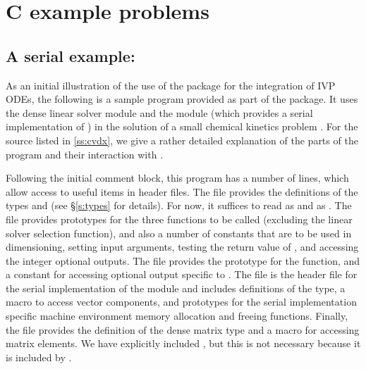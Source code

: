 \section{C example problems}\label{s:ex_c}

\subsection{A serial example: }\label{ss:kinwebs}

As an initial illustration of the use of the {\cvodes} package for the
integration of IVP ODEs, the following is a sample program provided as part 
of the package.  It uses the {\cvodes} dense linear solver module {\cvdense} 
and the {\nvecs} module (which provides a serial implementation of {\nvector})
in the solution of a small chemical kinetics problem
.
For the source listed in \A\ref{ss:cvdx}, we give a rather detailed explanation of 
the parts of the program and their interaction with {\cvodes}.

Following the initial comment block, this program has a number
of  lines, which allow access to useful items in {\cvodes}
header files.  The  file provides the definitions of the
types  and  (see \S\ref{s:types} for
details).  For now, it suffices to read  as  and
 as .
The  file provides prototypes for the three {\cvodes}
functions to be called (excluding the linear solver selection
function), and also a number of constants that are to be used in
dimensioning, setting input arguments, testing the return value of
, and accessing the integer optional outputs.
The  file provides the prototype for the  
function, and a constant  for accessing optional output 
specific to {\cvdense}.  
The  file is the header file for the serial implementation
of the {\nvector} module and includes definitions of the 
 type, a macro to access vector components, and prototypes 
for the serial implementation specific machine environment memory allocation
and freeing functions.
Finally, the  file provides the definition of the dense
matrix type  and a macro for accessing matrix elements.
We have explicitly included , but this is not necessary because 
it is included by .

